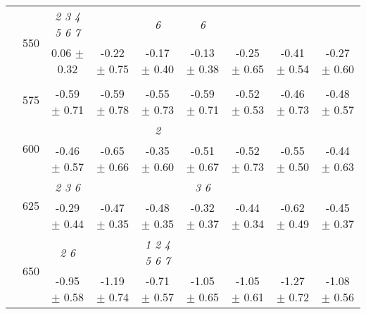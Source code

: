 \begin{table}[h]
{\begin{tabular}{
        ccccccccc}
 & \multirow{2}{*}{550}& \textit{ 2 3 4 5 6 7 }& & \textit{ 6 }& \textit{ 6 }& & &  \\ 
 & & 0.06 $\pm$ 0.32& -0.22 $\pm$ 0.75& -0.17 $\pm$ 0.40& -0.13 $\pm$ 0.38& -0.25 $\pm$ 0.65& -0.41 $\pm$ 0.54& -0.27 $\pm$ 0.60 \\ 
 & \multirow{2}{*}{575}& \cellcolor[HTML]{EFEFEF} & \cellcolor[HTML]{EFEFEF} & \cellcolor[HTML]{EFEFEF} & \cellcolor[HTML]{EFEFEF} & \cellcolor[HTML]{EFEFEF} & \cellcolor[HTML]{EFEFEF} & \cellcolor[HTML]{EFEFEF}  \\ 
 & & \cellcolor[HTML]{EFEFEF} -0.59 $\pm$ 0.71& \cellcolor[HTML]{EFEFEF} -0.59 $\pm$ 0.78& \cellcolor[HTML]{EFEFEF} -0.55 $\pm$ 0.73& \cellcolor[HTML]{EFEFEF} -0.59 $\pm$ 0.71& \cellcolor[HTML]{EFEFEF} -0.52 $\pm$ 0.53& \cellcolor[HTML]{EFEFEF} -0.46 $\pm$ 0.73& \cellcolor[HTML]{EFEFEF} -0.48 $\pm$ 0.57 \\ 
 & \multirow{2}{*}{600}& & & \textit{ 2 }& & & &  \\ 
 & & -0.46 $\pm$ 0.57& -0.65 $\pm$ 0.66& -0.35 $\pm$ 0.60& -0.51 $\pm$ 0.67& -0.52 $\pm$ 0.73& -0.55 $\pm$ 0.50& -0.44 $\pm$ 0.63 \\ 
 & \multirow{2}{*}{625}& \cellcolor[HTML]{EFEFEF} \textit{ 2 3 6 }& \cellcolor[HTML]{EFEFEF} & \cellcolor[HTML]{EFEFEF} & \cellcolor[HTML]{EFEFEF} \textit{ 3 6 }& \cellcolor[HTML]{EFEFEF} & \cellcolor[HTML]{EFEFEF} & \cellcolor[HTML]{EFEFEF}  \\ 
 & & \cellcolor[HTML]{EFEFEF} -0.29 $\pm$ 0.44& \cellcolor[HTML]{EFEFEF} -0.47 $\pm$ 0.35& \cellcolor[HTML]{EFEFEF} -0.48 $\pm$ 0.35& \cellcolor[HTML]{EFEFEF} -0.32 $\pm$ 0.37& \cellcolor[HTML]{EFEFEF} -0.44 $\pm$ 0.34& \cellcolor[HTML]{EFEFEF} -0.62 $\pm$ 0.49& \cellcolor[HTML]{EFEFEF} -0.45 $\pm$ 0.37 \\ 
 & \multirow{2}{*}{650}& \textit{ 2 6 }& & \textit{ 1 2 4 5 6 7 }& & & &  \\ 
 & & -0.95 $\pm$ 0.58& -1.19 $\pm$ 0.74& -0.71 $\pm$ 0.57& -1.05 $\pm$ 0.65& -1.05 $\pm$ 0.61& -1.27 $\pm$ 0.72& -1.08 $\pm$ 0.56 \\ \midrule 

        \bottomrule
        \end{tabular}%
        }

        \end{table}
        
